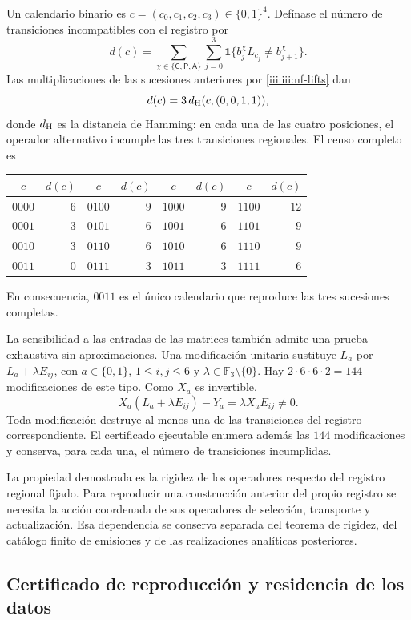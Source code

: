 Un calendario binario es $c=(c_0,c_1,c_2,c_3)\in\{0,1\}^4$.
Defínase el número de transiciones incompatibles con el registro por
\begin{equation}
 d(c)=\sum_{\chi\in\{\mathsf C,\mathsf P,\mathsf A\}}
       \sum_{j=0}^{3}
       \mathbf1\{b_j^\chi L_{c_j}\ne b_{j+1}^\chi\}.
 \label{iii:iii:nf-calendario}
\end{equation}
Las multiplicaciones de las sucesiones anteriores por
\eqref{iii:iii:nf-lifts} dan
\[
 d(c)=3\,d_{\rm H}(c,(0,0,1,1)),
\]
donde $d_{\rm H}$ es la distancia de Hamming: en cada una de las
cuatro posiciones, el operador alternativo incumple las tres
transiciones regionales. El censo completo es
\begin{center}
\begin{tabular}{cr@{\qquad}cr@{\qquad}cr@{\qquad}cr}
$c$&$d(c)$&$c$&$d(c)$&$c$&$d(c)$&$c$&$d(c)$\\ \hline
$0000$&$6$&$0100$&$9$&$1000$&$9$&$1100$&$12$\\
$0001$&$3$&$0101$&$6$&$1001$&$6$&$1101$&$9$\\
$0010$&$3$&$0110$&$6$&$1010$&$6$&$1110$&$9$\\
$0011$&$0$&$0111$&$3$&$1011$&$3$&$1111$&$6$
\end{tabular}
\end{center}
En consecuencia, $0011$ es el único calendario que reproduce las
tres sucesiones completas.

La sensibilidad a las entradas de las matrices también admite una
prueba exhaustiva sin aproximaciones. Una modificación unitaria
sustituye $L_a$ por $L_a+\lambda E_{ij}$, con
$a\in\{0,1\}$, $1\le i,j\le6$ y
$\lambda\in\mathbb F_3\setminus\{0\}$. Hay
$2\cdot6\cdot6\cdot2=144$ modificaciones de este tipo. Como
$X_a$ es invertible,
\[
 X_a(L_a+\lambda E_{ij})-Y_a
 =\lambda X_aE_{ij}\ne0.
\]
Toda modificación destruye al menos una de las transiciones del
registro correspondiente. El certificado ejecutable enumera además
las $144$ modificaciones y conserva, para cada una, el número de
transiciones incumplidas.

La propiedad demostrada es la rigidez de los operadores respecto del
registro regional fijado. Para reproducir una construcción anterior
del propio registro se necesita la acción coordenada de sus operadores
de selección, transporte y actualización. Esa dependencia se conserva
separada del teorema de rigidez, del catálogo finito de emisiones y
de las realizaciones analíticas posteriores.

\subsection{Certificado de reproducción y residencia de los datos}

